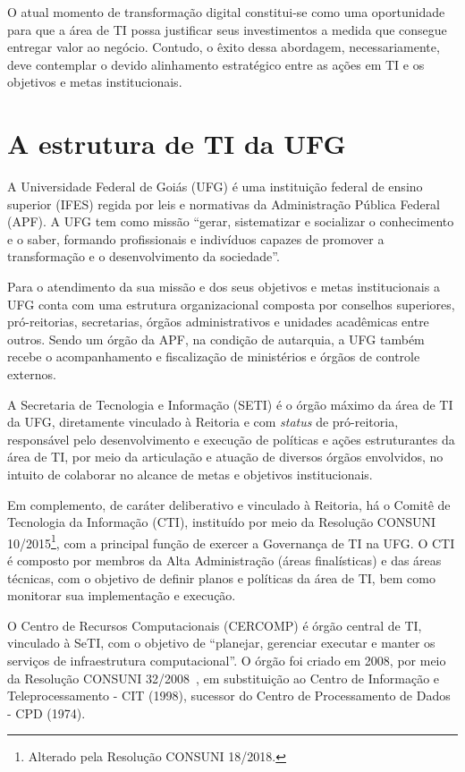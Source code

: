 O atual momento de transformação digital constitui-se como uma oportunidade para que a área de TI possa justificar seus investimentos a medida que consegue entregar valor ao negócio. Contudo, o êxito dessa abordagem, necessariamente, deve contemplar o devido alinhamento estratégico entre as ações em TI e os objetivos e metas institucionais. 


\section{A estrutura de TI da UFG}
\label{sec:TIUFG}

A Universidade Federal de Goiás (UFG) é uma instituição federal de ensino superior (IFES) regida por leis e normativas da Administração Pública Federal (APF). A UFG tem como missão ``gerar, sistematizar e socializar o conhecimento e o saber, formando profissionais e indivíduos capazes de promover a transformação e o desenvolvimento da sociedade''.

Para o atendimento da sua missão e dos seus objetivos e metas institucionais a UFG conta com uma estrutura organizacional composta por conselhos superiores, pró-reitorias, secretarias, órgãos administrativos e unidades acadêmicas entre outros. Sendo um órgão da APF, na condição de autarquia, a UFG também recebe o acompanhamento e fiscalização de ministérios e órgãos de controle externos.  

A Secretaria de Tecnologia e Informação (SETI) é o órgão máximo da área de TI da UFG, diretamente vinculado à Reitoria e com \textit{status} de pró-reitoria, responsável pelo desenvolvimento e execução de políticas e ações estruturantes da área de TI, por meio da articulação e atuação de diversos órgãos envolvidos, no intuito de colaborar no alcance de metas e objetivos institucionais.

Em complemento, de caráter deliberativo e vinculado à Reitoria, há o Comitê de Tecnologia da Informação (CTI), instituído por meio da Resolução CONSUNI 10/2015\footnote{Alterado pela Resolução CONSUNI 18/2018.}, com a principal função de exercer a Governança de TI na UFG. O CTI é composto por membros da Alta Administração (áreas finalísticas) e das áreas técnicas, com o objetivo de definir planos e políticas da área de TI, bem como monitorar sua implementação e execução.

O Centro de Recursos Computacionais (CERCOMP) é órgão central de TI, vinculado à SeTI, com o objetivo de ``planejar, gerenciar executar e manter os serviços de infraestrutura computacional''. O órgão foi criado em 2008, por meio da Resolução CONSUNI 32/2008~\cite{Cercomp2018}, em substituição ao Centro de Informação e Teleprocessamento - CIT (1998), sucessor do Centro de Processamento de Dados - CPD (1974).

